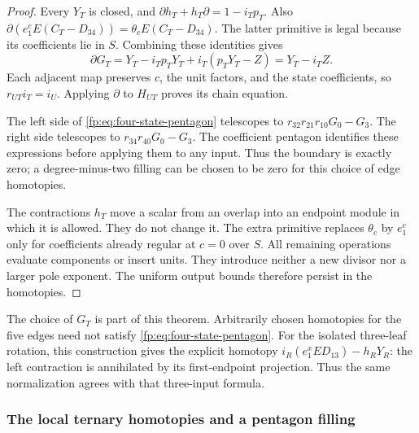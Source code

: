 \begin{proof}
Every \(Y_T\) is closed, and
\(\partial h_T+h_T\partial=1-i_Tp_T\).
Also
\(\partial(e_1^cE(C_T-D_{34}))=\theta_cE(C_T-D_{34})\).
The latter primitive is legal because its coefficients lie in \(S\).
Combining these identities gives
\[
 \partial G_T=Y_T-i_Tp_TY_T+i_T(p_TY_T-Z)=Y_T-i_TZ.
\]
Each adjacent map preserves \(c\), the unit factors, and the
state coefficients, so \(r_{UT}i_T=i_U\).
Applying \(\partial\) to \(H_{UT}\) proves its chain equation.

The left side of \eqref{fp:eq:four-state-pentagon} telescopes to
\(r_{32}r_{21}r_{10}G_0-G_3\).
The right side telescopes to \(r_{34}r_{40}G_0-G_3\).
The coefficient pentagon identifies these expressions before applying
them to any input.  Thus the boundary is exactly zero; a
degree-minus-two filling can be chosen to be zero for this choice
of edge homotopies.

The contractions \(h_T\) move a scalar from an overlap into
an endpoint module in which it is allowed.  They do not change it.
The extra primitive replaces \(\theta_c\) by \(e_1^c\)
only for coefficients already regular at \(c=0\) over \(S\).
All remaining operations evaluate components or insert units.
They introduce neither a new divisor nor a larger pole exponent.
The uniform output bounds therefore persist in the homotopies.
\end{proof}

The choice of \(G_T\) is part of this theorem.  Arbitrarily
chosen homotopies for the five edges need not satisfy
\eqref{fp:eq:four-state-pentagon}.  For the isolated three-leaf
rotation, this construction gives the explicit homotopy
\(i_R(e_1^xED_{13})-h_RY_R\): the left contraction is
annihilated by its first-endpoint projection.  Thus the same
normalization agrees with that three-input formula.

\subsubsection{The local ternary homotopies and a pentagon filling}

